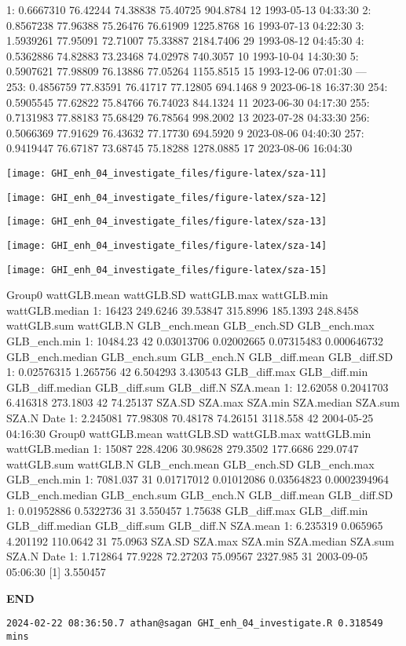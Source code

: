 \documentclass[
  10pt,
  a4paper,oneside]{article}
\begin{document}
1: 0.6667310 76.42244 74.38838 75.40725 904.8784 12 1993-05-13 04:33:30
2: 0.8567238 77.96388 75.26476 76.61909 1225.8768 16 1993-07-13 04:22:30
3: 1.5939261 77.95091 72.71007 75.33887 2184.7406 29 1993-08-12 04:45:30
4: 0.5362886 74.82883 73.23468 74.02978 740.3057 10 1993-10-04 14:30:30
5: 0.5907621 77.98809 76.13886 77.05264 1155.8515 15 1993-12-06 07:01:30
---\\
253: 0.4856759 77.83591 76.41717 77.12805 694.1468 9 2023-06-18 16:37:30
254: 0.5905545 77.62822 75.84766 76.74023 844.1324 11 2023-06-30 04:17:30
255: 0.7131983 77.88183 75.68429 76.78564 998.2002 13 2023-07-28 04:33:30
256: 0.5066369 77.91629 76.43632 77.17730 694.5920 9 2023-08-06 04:40:30
257: 0.9419447 76.67187 73.68745 75.18288 1278.0885 17 2023-08-06 16:04:30

\begin{center}\texttt{[image: GHI\_enh\_04\_investigate\_files/figure-latex/sza-11]} \end{center}

\begin{center}\texttt{[image: GHI\_enh\_04\_investigate\_files/figure-latex/sza-12]} \end{center}

\begin{center}\texttt{[image: GHI\_enh\_04\_investigate\_files/figure-latex/sza-13]} \end{center}

\begin{center}\texttt{[image: GHI\_enh\_04\_investigate\_files/figure-latex/sza-14]} \end{center}

\begin{center}\texttt{[image: GHI\_enh\_04\_investigate\_files/figure-latex/sza-15]} \end{center}

Group0 wattGLB.mean wattGLB.SD wattGLB.max wattGLB.min wattGLB.median
1: 16423 249.6246 39.53847 315.8996 185.1393 248.8458
wattGLB.sum wattGLB.N GLB\_ench.mean GLB\_ench.SD GLB\_ench.max GLB\_ench.min
1: 10484.23 42 0.03013706 0.02002665 0.07315483 0.000646732
GLB\_ench.median GLB\_ench.sum GLB\_ench.N GLB\_diff.mean GLB\_diff.SD
1: 0.02576315 1.265756 42 6.504293 3.430543
GLB\_diff.max GLB\_diff.min GLB\_diff.median GLB\_diff.sum GLB\_diff.N SZA.mean
1: 12.62058 0.2041703 6.416318 273.1803 42 74.25137
SZA.SD SZA.max SZA.min SZA.median SZA.sum SZA.N Date
1: 2.245081 77.98308 70.48178 74.26151 3118.558 42 2004-05-25 04:16:30
Group0 wattGLB.mean wattGLB.SD wattGLB.max wattGLB.min wattGLB.median
1: 15087 228.4206 30.98628 279.3502 177.6686 229.0747
wattGLB.sum wattGLB.N GLB\_ench.mean GLB\_ench.SD GLB\_ench.max GLB\_ench.min
1: 7081.037 31 0.01717012 0.01012086 0.03564823 0.0002394964
GLB\_ench.median GLB\_ench.sum GLB\_ench.N GLB\_diff.mean GLB\_diff.SD
1: 0.01952886 0.5322736 31 3.550457 1.75638
GLB\_diff.max GLB\_diff.min GLB\_diff.median GLB\_diff.sum GLB\_diff.N SZA.mean
1: 6.235319 0.065965 4.201192 110.0642 31 75.0963
SZA.SD SZA.max SZA.min SZA.median SZA.sum SZA.N Date
1: 1.712864 77.9228 72.27203 75.09567 2327.985 31 2003-09-05 05:06:30
{[}1{]} 3.550457

\textbf{END}

\begin{verbatim}
2024-02-22 08:36:50.7 athan@sagan GHI_enh_04_investigate.R 0.318549 mins
\end{verbatim}
\end{document}
